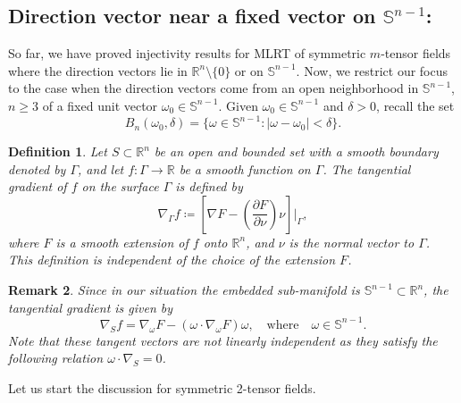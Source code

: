 \documentclass[11pt,a4paper,reqno]{amsart}
\newtheorem{definition}{Definition}[section]
\newtheorem{remark}[definition]{Remark}
\newcommand{\Rn}{\mathbb{R}^n}
\renewcommand{\S}{\mathbb{S}}
\newcommand{\om}{\omega}
\newcommand{\sn}{\mathbb{S}^{n-1}}
\begin{document}
	\subsection{Direction vector near a fixed  vector on $\sn$:}\label{Sub-section3.3}
	So far, we have proved injectivity results for MLRT of symmetric $m$-tensor fields where the direction vectors lie in \(\mathbb{R}^{n} \setminus \{0\}\) or on $\S^{n-1}$. Now, we restrict our focus to the case when the direction vectors come from an open neighborhood in $\sn$, $n \geq 3$ of a fixed unit vector $\om_0 \in \sn$. Given $\om_0 \in\sn$ and $\delta>0$, recall the set 
	\[
	B_n(\om_0,\delta) = \{ \om \in \sn : |\om-\om_0|<\delta\}.
	\]
	
	\begin{definition}\label{tanggrad}\cite{pressley2010elementary}
		Let \( S \subset \mathbb{R}^{n} \) be an open and bounded set with a smooth boundary denoted by \( \Gamma \), and let \( f : \Gamma \to \mathbb{R} \) be a smooth function on \( \Gamma \). The tangential gradient of \( f \) on the surface \( \Gamma \) is defined by
		\begin{equation}
			\nabla_{\Gamma} f \coloneqq \left[\nabla F - \left( \frac{\partial F}{\partial \nu} \right) \nu\right] \Big|_{\Gamma},
		\end{equation}
		where \( F \) is a smooth extension of \( f \) onto \( \mathbb{R}^{n} \), and \( \nu \) is the normal vector to \( \Gamma \). This definition is independent of the choice of the extension \( F \). 
	\end{definition}
	\begin{remark}
			Since in our situation the embedded sub-manifold is $\sn\subset \Rn$, the tangential gradient is given by 
		\begin{equation*}
		\nabla_S f = \nabla_{\omega} F - (\omega\cdot \nabla_{\omega} F)\om, \quad \mbox{where} \quad \omega \in \sn.
		\end{equation*}
		Note that these tangent vectors are not linearly independent as they satisfy the following relation $ \omega\cdot \nabla_S =0$. 
	\end{remark}
	Let us start the discussion for symmetric 2-tensor fields.
\end{document}
